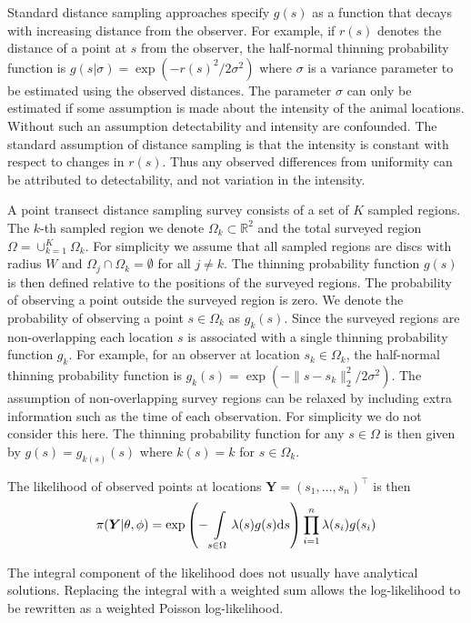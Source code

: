 \documentclass[preprint,12pt]{elsarticle}
\newcommand{\bm}{\boldsymbol}  %
\begin{document}
Standard distance sampling approaches specify $g(s)$ as a function that decays with increasing distance from the observer.  For example, if $r(s)$ denotes the distance of a point at $s$ from the observer, the half-normal thinning probability function is $g(s | \sigma) = \exp(-r(s)^2 / 2\sigma^2)$ where $\sigma$ is a variance parameter to be estimated using the observed distances.  The parameter $\sigma$ can only be estimated if some assumption is made about the intensity of the animal locations.  Without such an assumption detectability and intensity are confounded.  The standard assumption of distance sampling is that the intensity is constant with respect to changes in $r(s)$.  Thus any observed differences from uniformity can be attributed to detectability, and not variation in the intensity.  

A point transect distance sampling survey consists of a set of $K$ sampled regions.  The $k$-th sampled region we denote $\Omega_k \subset \mathbb{R}^2$ and the total surveyed region $\Omega = \cup_{k=1}^K \Omega_k$.  For simplicity we assume that all sampled regions are discs with radius $W$ and $\Omega_j \cap \Omega_k = \emptyset$ for all $j \neq k$.  The thinning probability function $g(s)$ is then defined relative to the positions of the surveyed regions.  The probability of observing a point outside the surveyed region is zero.  We denote the probability of observing a point $s \in \Omega_k$ as $g_k(s)$.  Since the surveyed regions are non-overlapping each location $s$ is associated with a single thinning probability function $g_k$.  For example, for an observer at location $s_k \in \Omega_k$, the half-normal thinning probability function is $g_k(s) = \exp(-\lVert s - s_k \rVert_2^2 / 2\sigma^2)$. The assumption of non-overlapping survey regions can be relaxed by including extra information such as the time of each observation.  For simplicity we do not consider this here.  The thinning probability function for any $s \in \Omega$ is then given by $g(s) = g_{k(s)}(s)$ where $k(s) = k$ for $s \in \Omega_k$.  

The likelihood of observed points at locations $\bm{Y} = (s_1, \ldots, s_n)^\intercal$ is then
\begin{equation}
\label{lgcp-likelihood}
\pi(\bm{Y} | \theta, \phi) = \exp\left(-\int\displaylimits_{s \in \Omega} \lambda(s) g(s) \mathrm{d}s \right)\prod_{i=1}^n \lambda(s_i)g(s_i)
\end{equation}

The integral component of the likelihood does not usually have analytical solutions.  Replacing the integral with a weighted sum allows the log-likelihood to be rewritten as a weighted Poisson log-likelihood.  
\end{document}
